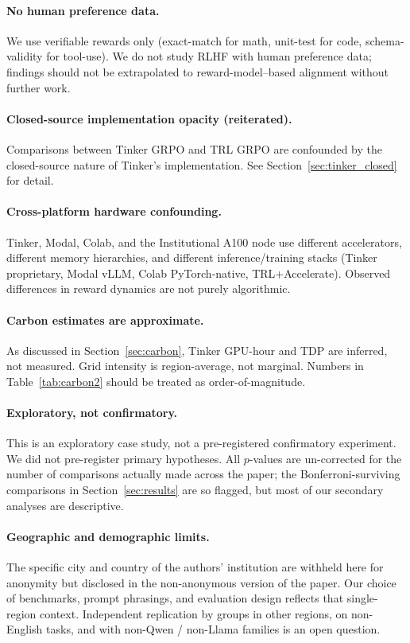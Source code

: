 \documentclass{article}
\begin{document}
\paragraph{No human preference data.}
We use verifiable rewards only (exact-match for math, unit-test for code,
schema-validity for tool-use). We do not study RLHF with human preference
data; findings should not be extrapolated to reward-model--based alignment
without further work.

\paragraph{Closed-source implementation opacity (reiterated).}
Comparisons between Tinker GRPO and TRL GRPO are confounded by the
closed-source nature of Tinker's implementation. See
Section~\ref{sec:tinker_closed} for detail.

\paragraph{Cross-platform hardware confounding.}
Tinker, Modal, Colab, and the Institutional A100 node use different accelerators,
different memory hierarchies, and different inference/training stacks
(Tinker proprietary, Modal vLLM, Colab PyTorch-native, TRL+Accelerate).
Observed differences in reward dynamics are not purely algorithmic.

\paragraph{Carbon estimates are approximate.}
As discussed in Section~\ref{sec:carbon}, Tinker GPU-hour and TDP are
inferred, not measured. Grid intensity is region-average, not marginal.
Numbers in Table~\ref{tab:carbon2} should be treated as
order-of-magnitude.

\paragraph{Exploratory, not confirmatory.}
This is an exploratory case study, not a pre-registered confirmatory
experiment. We did not pre-register primary hypotheses. All $p$-values are
un-corrected for the number of comparisons actually made across the
paper; the Bonferroni-surviving comparisons in
Section~\ref{sec:results} are so flagged, but most of our secondary
analyses are descriptive.

\paragraph{Geographic and demographic limits.}
The specific city and country of the authors' institution are withheld
here for anonymity but disclosed in the non-anonymous version of the
paper. Our choice of benchmarks, prompt phrasings, and evaluation design
reflects that single-region context. Independent replication by groups
in other regions, on non-English tasks, and with non-Qwen / non-Llama
families is an open question.

 
\end{document}
